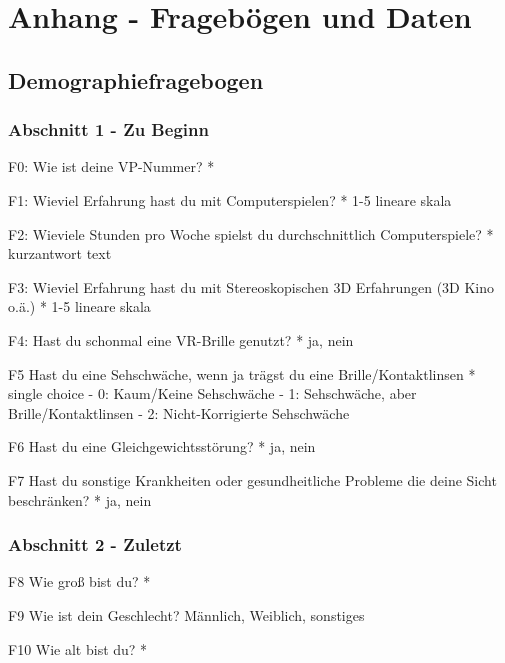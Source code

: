 \chapter*{Anhang - Fragebögen und Daten}

\section*{Demographiefragebogen}

\subsection*{Abschnitt 1 - Zu Beginn}

F0: Wie ist deine VP-Nummer? *

F1: Wieviel Erfahrung hast du mit Computerspielen? *
1-5 lineare skala

F2: Wieviele Stunden pro Woche spielst du durchschnittlich Computerspiele? *
kurzantwort text

F3: Wieviel Erfahrung hast du mit Stereoskopischen 3D Erfahrungen (3D Kino o.ä.) *
1-5 lineare skala

F4: Hast du schonmal eine VR-Brille genutzt? *
ja, nein

F5 Hast du eine Sehschwäche, wenn ja trägst du eine Brille/Kontaktlinsen *
single choice
- 0: Kaum/Keine Sehschwäche
- 1: Sehschwäche, aber Brille/Kontaktlinsen
- 2: Nicht-Korrigierte Sehschwäche

F6 Hast du eine Gleichgewichtsstörung? *
ja, nein

F7 Hast du sonstige Krankheiten oder gesundheitliche Probleme die deine Sicht beschränken? *
ja, nein

\subsection*{Abschnitt 2 - Zuletzt}

F8 Wie groß bist du? *

F9 Wie ist dein Geschlecht?
Männlich, Weiblich, sonstiges

F10 Wie alt bist du? *

